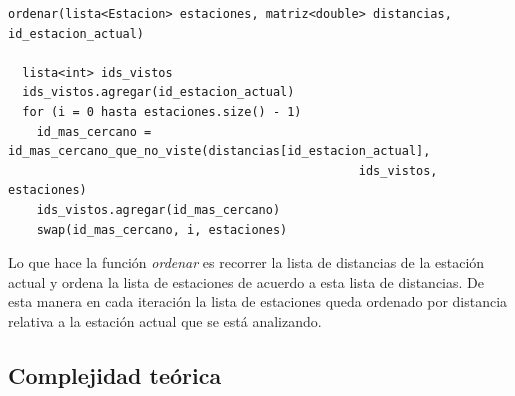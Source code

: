             \begin{codesnippet}
            \begin{verbatim}





ordenar(lista<Estacion> estaciones, matriz<double> distancias, id_estacion_actual)

  lista<int> ids_vistos
  ids_vistos.agregar(id_estacion_actual)
  for (i = 0 hasta estaciones.size() - 1)
    id_mas_cercano = id_mas_cercano_que_no_viste(distancias[id_estacion_actual], 
                                                 ids_vistos, estaciones)
    ids_vistos.agregar(id_mas_cercano)
    swap(id_mas_cercano, i, estaciones)
            \end{verbatim}
            \end{codesnippet}


Lo que hace la función \textit{ordenar} es recorrer la lista de distancias de la estación actual y ordena la lista de estaciones de acuerdo a esta lista de distancias. De esta manera en cada iteración la lista de estaciones queda ordenado por distancia relativa a la estación actual que se está analizando. 



            

    \subsection{Complejidad teórica}

